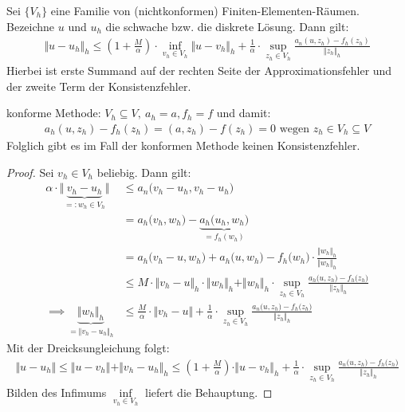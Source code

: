 \begin{theorem}\label{theorem5.1ZweitesLemmaStrang}\enter
Sei $\lbrace V_h\rbrace$ eine Familie von (nichtkonformen) Finiten-Elementen-Räumen. Bezeichne $u$ und $u_h$ die schwache bzw. die diskrete Lösung. Dann gilt:
\begin{align*}
\big\Vert u-u_h\big\Vert_h\leq\left(1+\frac{M}{\alpha}\right)\cdot\inf\limits_{v_h\in V_h}\big\Vert u-v_h\big\Vert_h
+\frac{1}{\alpha}\cdot\sup\limits_{z_h\in V_h}\frac{a_n(u,z_h)-f_h(z_h)}{\Vert z_h\Vert_h}
\end{align*}
Hierbei ist erste Summand auf der rechten Seite der Approximationsfehler und der zweite Term der Konsistenzfehler.
\end{theorem}

\begin{bemerkung}
konforme Methode: $V_h\subseteq V,~a_h=a,f_h=f$ und damit:
\begin{align*}
a_h(u,z_h)-f_h(z_h)=(a,z_h)-f(z_h)=0\text{ wegen } z_h\in V_h\subseteq V
\end{align*}
Folglich gibt es im Fall der konformen Methode keinen Konsistenzfehler.
\end{bemerkung}

\begin{proof}
Sei $v_h\in V_h$ beliebig. Dann gilt:
\begin{align*}
\alpha\cdot\big\Vert\underbrace{v_h-u_h}_{=:w_h\in V_h}\big\Vert
&\leq a_n\big(v_h-u_h,v_h-u_h\big)\\
&=a_h\big(v_h,w_h\big)-\underbrace{a_h\big(u_h,w_h\big)}_{=f_h(w_h)}\\
&=a_h\big(v_h-u,w_h\big)+a_h\big(u,w_h\big)-f_h\big(w_h\big)\cdot\frac{\Vert w_h\Vert_h}{\Vert w_h\Vert_h}\\
&\leq M\cdot\big\Vert v_h-u\big\Vert_h\cdot\big\Vert w_h\big\Vert_h+\Vert w_h\Vert_h\cdot\sup\limits_{z_h\in V_h}\frac{a_h\big(u,z_h\big)-f_h\big(z_h\big)}{\Vert z_h\Vert_h}\\
\implies
\underbrace{\Vert w_h\Vert_h}_{=\Vert v_h-u_h\Vert_h}&\leq\frac{M}{\alpha}\cdot\big\Vert v_h-u\big\Vert+\frac{1}{\alpha}\cdot\sup\limits_{z_h\in V_h}\frac{a_n\big(u,z_h\big)-f_h\big(z_h\big)}{\Vert z_h\Vert_h}
\end{align*}
Mit der Dreicksungleichung folgt:
\begin{align*}
\Vert u-u_h\Vert\leq\Vert u-v_h\Vert+\Vert v_h-u_h\Vert_h\leq\left(1+\frac{M}{\alpha}\right)\cdot\Vert u-v_h\Vert_h+\frac{1}{\alpha}\cdot\sup\limits_{z_h\in V_h}\frac{a_n\big(u,z_h\big)-f_h\big(z_h\big)}{\Vert z_h\Vert_h}
\end{align*}
Bilden des Infimums $\inf\limits_{v_h\in V_h}$ liefert die Behauptung.
\end{proof}





